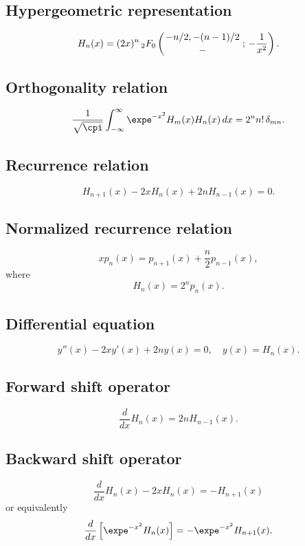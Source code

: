 \documentclass[envcountchap,graybox]{svmono}
\newcommand{\hyp}[5]{\mbox{}_{#1}{F}_{#2}
\left(\genfrac{}{}{0pt}{}{#3}{#4}\,;\,#5\right)}
\begin{document}
\subsection*{Hypergeometric representation}
\begin{equation}
\label{DefHermite}
H_n(x)=(2x)^n\,\hyp{2}{0}{-n/2,-(n-1)/2}{-}{-\frac{1}{x^2}}.
\end{equation}

\subsection*{Orthogonality relation}
\begin{equation}
\label{OrtHermite}
\frac{1}{\sqrt{\cpi}}\int_{-\infty}^{\infty}\expe^{-x^2}H_m(x)H_n(x)\,dx
=2^nn!\,\delta_{mn}.
\end{equation}

\subsection*{Recurrence relation}
\begin{equation}
\label{RecHermite}
H_{n+1}(x)-2xH_n(x)+2nH_{n-1}(x)=0.
\end{equation}

\subsection*{Normalized recurrence relation}
\begin{equation}
\label{NormRecHermite}
xp_n(x)=p_{n+1}(x)+\frac{n}{2}p_{n-1}(x),
\end{equation}
where
$$H_n(x)=2^np_n(x).$$

\subsection*{Differential equation}
\begin{equation}
\label{dvHermite}
y''(x)-2xy'(x)+2ny(x)=0,\quad y(x)=H_n(x).
\end{equation}

\subsection*{Forward shift operator}
\begin{equation}
\label{shift1Hermite}
\frac{d}{dx}H_n(x)=2nH_{n-1}(x).
\end{equation}

\subsection*{Backward shift operator}
\begin{equation}
\label{shift2HermiteI}
\frac{d}{dx}H_n(x)-2xH_n(x)=-H_{n+1}(x)
\end{equation}
or equivalently
\begin{equation}
\label{shift2HermiteII}
\frac{d}{dx}\left[\expe^{-x^2}H_n(x)\right]=-\expe^{-x^2}H_{n+1}(x).
\end{equation}
\end{document}
